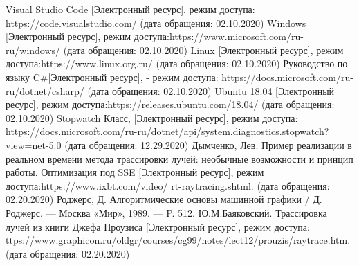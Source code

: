 \begin{thebibliography}{3}
	Visual Studio Code [Электронный ресурс], режим доступа: https://code.visualstudio.com/ (дата обращения: 02.10.2020)
	Windows [Электронный ресурс], режим доступа:https://www.microsoft.com/ru-ru/windows/ (дата обращения: 02.10.2020)
	Linux [Электронный ресурс], режим доступа:https://www.linux.org.ru/ (дата обращения: 02.10.2020)
	Руководство по языку C\#[Электронный ресурс], - режим доступа: https://docs.microsoft.com/ru-ru/dotnet/csharp/ (дата обращения: 02.10.2020)
	Ubuntu 18.04 [Электронный ресурс], режим доступа:https://releases.ubuntu.com/18.04/ (дата обращения: 02.10.2020)
	Stopwatch Класс, [Электронный ресурс], режим доступа:
	https://docs.microsoft.com/ru-ru/dotnet/api/system.diagnostics.stopwatch?view=net-5.0  (дата обращения: 12.29.2020)
	Дымченко, Лев. Пример реализации в реальном времени метода
	трассировки лучей: необычные возможности и принцип работы. Оптимизация
	под SSE [Электронный ресурс],  режим доступа:https://www.ixbt.com/video/
	rt-raytracing.shtml. (дата обращения: 02.20.2020)
	Роджерс, Д. Алгоритмические основы машинной графики / Д. Роджерс. — Москва «Мир», 1989. — P. 512.
	Ю.М.Баяковский. Трассировка лучей из книги Джефа Проузиса [Электронный ресурс],
	режим доступа: ttps://www.graphicon.ru/oldgr/courses/cg99/notes/lect12/prouzis/raytrace.htm. (дата обращения: 02.20.2020)
\end{thebibliography}
